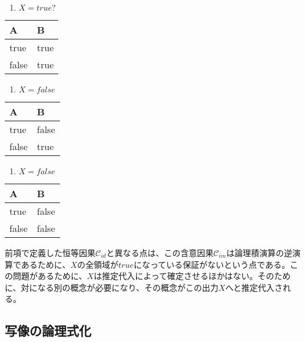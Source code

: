 \documentclass[12pt]{article}
\begin{document}
\begin{enumerate}
\def\labelenumi{\arabic{enumi}.}

\item
  \(X=true?\)
\end{enumerate}

\begin{longtable}[]{@{}ll@{}}
\toprule\noalign{}
A & B \\
\midrule\noalign{}
\endhead
\bottomrule\noalign{}
\endlastfoot
true & true \\
false & true \\
\end{longtable}

\begin{enumerate}
\def\labelenumi{\arabic{enumi}.}
\setcounter{enumi}{2}

\item
  \(X=false\)
\end{enumerate}

\begin{longtable}[]{@{}ll@{}}
\toprule\noalign{}
A & B \\
\midrule\noalign{}
\endhead
\bottomrule\noalign{}
\endlastfoot
true & false \\
false & true \\
\end{longtable}

\begin{enumerate}
\def\labelenumi{\arabic{enumi}.}
\setcounter{enumi}{3}

\item
  \(X=false\)
\end{enumerate}

\begin{longtable}[]{@{}ll@{}}
\toprule\noalign{}
A & B \\
\midrule\noalign{}
\endhead
\bottomrule\noalign{}
\endlastfoot
true & false \\
false & false \\
\end{longtable}

前項で定義した恒等因果\(\mathcal{C}_{id}\)と異なる点は、この含意因果\(\mathcal{C}_{im}\)は論理積演算の逆演算であるために、\(X\)の全領域が\(true\)になっている保証がないという点である。この問題があるために、\(X\)は推定代入によって確定させるほかはない。そのために、対になる別の概念が必要になり、その概念がこの出力\(X\)へと推定代入される。

\subsection{写像の論理式化}\label{ux5199ux50cfux306eux8ad6ux7406ux5f0fux5316}
\end{document}
